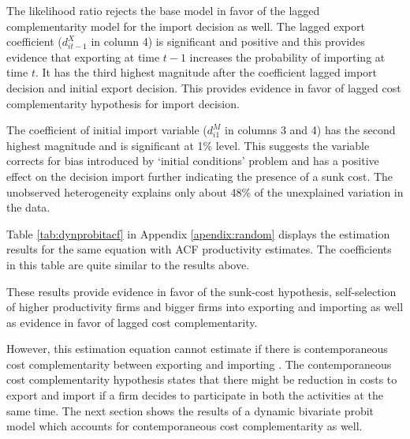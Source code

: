 \documentclass[12pt]{article}
\begin{document}
The likelihood ratio rejects the base model in favor of the lagged
complementarity model for the import decision as well. The lagged export coefficient ($d_{it-1}^{X}$ in column 4) is
  significant and positive and this provides evidence that exporting
  at time $t-1$ increases the probability of importing at time $t$. It
  has the third highest magnitude after the coefficient lagged import
  decision and initial export decision.  This
provides  evidence in favor of 
  lagged cost complementarity hypothesis for
  import decision.  

The coefficient of initial import variable ($d_{i1}^{M}$ in columns 3
and 4) has the
second highest magnitude  and is 
  significant at 1\% level. This suggests the variable corrects for
  bias introduced by `initial conditions' problem and has a positive
  effect on the decision import further indicating the presence of a
  sunk cost. The
  unobserved heterogeneity  explains only about 48\% of the unexplained
  variation in the data.  

Table \ref{tab:dynprobitacf} in Appendix \ref{apendix:random} displays the estimation results for the same
equation with ACF productivity estimates. The coefficients in this
table are quite similar to the results above. 

These results provide evidence in favor of  the sunk-cost hypothesis,
self-selection of higher productivity firms and bigger firms into
exporting and importing as well as evidence in favor of lagged cost
complementarity. 

However, this estimation equation cannot estimate if
there is contemporaneous cost complementarity between exporting
and importing . The contemporaneous cost complementarity hypothesis
states that there might be reduction in costs to export and import if
a firm decides to participate in both the activities at the same time.
The next section shows the results of a dynamic
bivariate probit model which accounts for contemporaneous cost complementarity
as well. 


\end{document}
